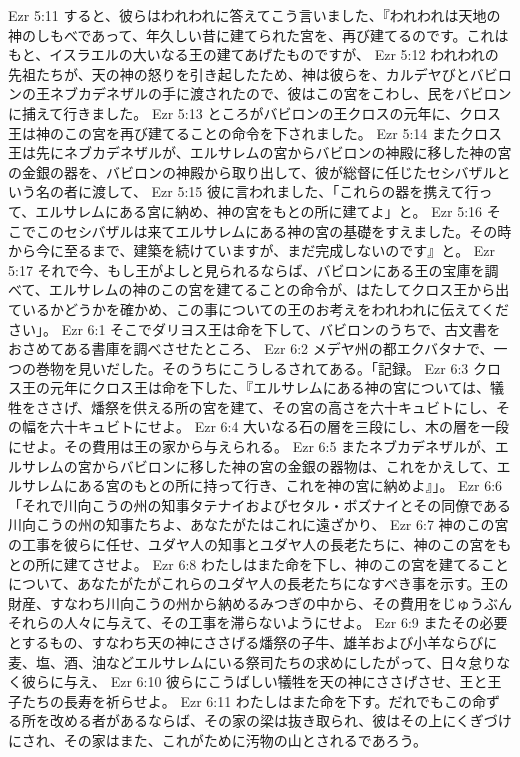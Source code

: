 Ezr 5:11  すると、彼らはわれわれに答えてこう言いました、『われわれは天地の神のしもべであって、年久しい昔に建てられた宮を、再び建てるのです。これはもと、イスラエルの大いなる王の建てあげたものですが、
Ezr 5:12  われわれの先祖たちが、天の神の怒りを引き起したため、神は彼らを、カルデヤびとバビロンの王ネブカデネザルの手に渡されたので、彼はこの宮をこわし、民をバビロンに捕えて行きました。
Ezr 5:13  ところがバビロンの王クロスの元年に、クロス王は神のこの宮を再び建てることの命令を下されました。
Ezr 5:14  またクロス王は先にネブカデネザルが、エルサレムの宮からバビロンの神殿に移した神の宮の金銀の器を、バビロンの神殿から取り出して、彼が総督に任じたセシバザルという名の者に渡して、
Ezr 5:15  彼に言われました、「これらの器を携えて行って、エルサレムにある宮に納め、神の宮をもとの所に建てよ」と。
Ezr 5:16  そこでこのセシバザルは来てエルサレムにある神の宮の基礎をすえました。その時から今に至るまで、建築を続けていますが、まだ完成しないのです』と。
Ezr 5:17  それで今、もし王がよしと見られるならば、バビロンにある王の宝庫を調べて、エルサレムの神のこの宮を建てることの命令が、はたしてクロス王から出ているかどうかを確かめ、この事についての王のお考えをわれわれに伝えてください」。
Ezr 6:1  そこでダリヨス王は命を下して、バビロンのうちで、古文書をおさめてある書庫を調べさせたところ、
Ezr 6:2  メデヤ州の都エクバタナで、一つの巻物を見いだした。そのうちにこうしるされてある。「記録。
Ezr 6:3  クロス王の元年にクロス王は命を下した、『エルサレムにある神の宮については、犠牲をささげ、燔祭を供える所の宮を建て、その宮の高さを六十キュビトにし、その幅を六十キュビトにせよ。
Ezr 6:4  大いなる石の層を三段にし、木の層を一段にせよ。その費用は王の家から与えられる。
Ezr 6:5  またネブカデネザルが、エルサレムの宮からバビロンに移した神の宮の金銀の器物は、これをかえして、エルサレムにある宮のもとの所に持って行き、これを神の宮に納めよ』」。
Ezr 6:6  「それで川向こうの州の知事タテナイおよびセタル・ボズナイとその同僚である川向こうの州の知事たちよ、あなたがたはこれに遠ざかり、
Ezr 6:7  神のこの宮の工事を彼らに任せ、ユダヤ人の知事とユダヤ人の長老たちに、神のこの宮をもとの所に建てさせよ。
Ezr 6:8  わたしはまた命を下し、神のこの宮を建てることについて、あなたがたがこれらのユダヤ人の長老たちになすべき事を示す。王の財産、すなわち川向こうの州から納めるみつぎの中から、その費用をじゅうぶんそれらの人々に与えて、その工事を滞らないようにせよ。
Ezr 6:9  またその必要とするもの、すなわち天の神にささげる燔祭の子牛、雄羊および小羊ならびに麦、塩、酒、油などエルサレムにいる祭司たちの求めにしたがって、日々怠りなく彼らに与え、
Ezr 6:10  彼らにこうばしい犠牲を天の神にささげさせ、王と王子たちの長寿を祈らせよ。
Ezr 6:11  わたしはまた命を下す。だれでもこの命ずる所を改める者があるならば、その家の梁は抜き取られ、彼はその上にくぎづけにされ、その家はまた、これがために汚物の山とされるであろう。
